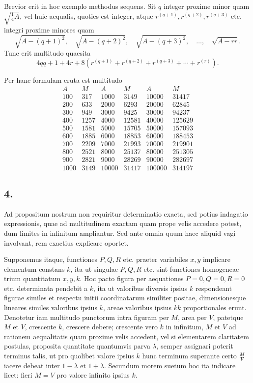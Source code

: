 \documentclass[12pt]{article}
\begin{document}
Brevior erit in hoc exemplo methodus sequens. Sit $q$ integer proxime minor quam $\sqrt{\frac14 A}$, vel huic aequalis, quoties est integer, atque $r^{(q+1)},r^{(q+2)},r^{(q+3)}$ etc. integri proxime minores quam
\[
\sqrt{A-(q+1)^2},\quad \sqrt{A-(q+2)^2},\quad \sqrt{A-(q+3)^2},\quad\ldots,\quad \sqrt{A-rr}.
\]
Tunc erit multitudo quaesita
\[
4qq+1+4r+8\left(r^{(q+1)}+r^{(q+2)}+r^{(q+3)}+\cdots+r^{(r)}\right).
\]

Per hanc formulam eruta est multitudo
\[
\begin{array}{rr|rr|rr}
A&M&A&M&A&M\\
100&317&1000&3149&10000&31417\\
200&633&2000&6293&20000&62845\\
300&949&3000&9425&30000&94237\\
400&1257&4000&12581&40000&125629\\
500&1581&5000&15705&50000&157093\\
600&1885&6000&18853&60000&188453\\
700&2209&7000&21993&70000&219901\\
800&2521&8000&25137&80000&251305\\
900&2821&9000&28269&90000&282697\\
1000&3149&10000&31417&100000&314197
\end{array}
\]

\subsection*{4.}

Ad propositum nostrum non requiritur determinatio exacta, sed potius indagatio expressionis, quae ad multitudinem exactam quam prope velis accedere potest, dum limites in infinitum ampliantur. Sed ante omnia quum haec aliquid vagi involvant, rem exactius explicare oportet.

Supponemus itaque, functiones $P,Q,R$ etc. praeter variabiles $x,y$ implicare elementum constans $k$, ita ut singulae $P,Q,R$ etc. sint functiones homogeneae trium quantitatum $x,y,k$. Hoc pacto figura per aequationes $P=0,Q=0,R=0$ etc. determinata pendebit a $k$, ita ut valoribus diversis ipsius $k$ respondeant figurae similes et respectu initii coordinatarum similiter positae, dimensionesque lineares similes valoribus ipsius $k$, areae valoribus ipsius $kk$ proportionales erunt. Denotetur iam multitudo punctorum intra figuram per $M$, area per $V$, patetque $M$ et $V$, crescente $k$, crescere debere; crescente vero $k$ in infinitum, $M$ et $V$ ad rationem aequalitatis quam proxime velis accedent, vel si elementarem claritatem postulas, proposita quantitate quantumvis parva $\lambda$, semper assignari poterit terminus talis, ut pro quolibet valore ipsius $k$ hunc terminum superante certo $\frac{M}{V}$ iacere debeat inter $1-\lambda$ et $1+\lambda$. Secundum morem suetum hoc ita indicare licet: fieri $M=V$ pro valore infinito ipsius $k$.
\end{document}
